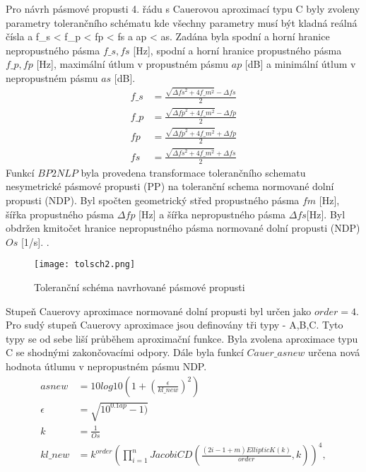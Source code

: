 Pro návrh pásmové propusti 4. řádu s Cauerovou aproximací typu C byly zvoleny parametry tolerančního schématu 
\noindent kde všechny parametry musí být kladná reálná čísla a f\_s <  f\_p < fp < fs a ap < as. Zadána byla spodní a horní hranice nepropustného pásma $f\_s,fs$ [Hz], spodní a horní hranice propustného pásma $f\_p,fp$ [Hz], maximální útlum v propustném pásmu $ap$ [dB] a minimální útlum v nepropustném pásmu $as$ [dB].
\begin{align}
f\_s &= \frac{\sqrt{\Delta{fs}^2+4f\_m ^2}-\Delta{fs}}{2}\\
f\_p &= \frac{\sqrt{\Delta{fp}^2+4f\_m ^2}-\Delta{fp}}{2}\\
fp &= \frac{\sqrt{\Delta{fp}^2+4f\_m ^2}+\Delta{fp}}{2}\\
fs &= \frac{\sqrt{\Delta{fs}^2+4f\_m ^2}+\Delta{fs}}{2}
\end{align}
Funkcí $BP2NLP$ byla provedena transformace tolerančního schematu nesymetrické pásmové propusti (PP) na toleranční schema normované dolní propusti (NDP). Byl spočten geometrický střed propustného pásma $fm$ [Hz], šířka propustného pásma $\Delta{fp}$ [Hz] a šířka nepropustného pásma $\Delta{fs} $[Hz].
\noindent Byl obdržen kmitočet hranice nepropustného pásma normované dolní propusti (NDP) $Os$ [1/s].
.
\begin{figure}[h]
\centering
\texttt{[image: tolsch2.png]}
\caption{Toleranční schéma navrhované pásmové propusti}
\end{figure}
\noindent Stupeň Cauerovy aproximace normované dolní propusti byl určen jako $order = 4$. Pro sudý stupeň Cauerovy aproximace jsou definovány tři typy - A,B,C. Tyto typy se od sebe liší průběhem aproximační funkce. Byla zvolena aproximace typu C se shodnými zakončovacími odpory.
\noindent Dále byla funkcí $Cauer\_asnew$ určena nová hodnota útlumu v nepropustném pásmu NDP.
\begin{align}
asnew&= 10log10(1 + ( \frac{\epsilon}{kl\_new})^2)\\
\epsilon &= \sqrt{10^{0.1ap} - 1)}\\
k &= \frac{1}{Os}\\
kl\_new &= k^{order}(\prod_{i=1}^{n}JacobiCD(\frac{(2i - 1 + m)EllipticK(k)}{order},k))^4,
\end{align}
